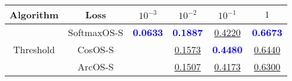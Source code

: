 \begin{table}[t]
\centering
\begin{tabularx}{.7\textwidth}{c|c|cccc}
\bf Algorithm & \bf Loss & $10^{-3}$ & $10^{-2}$ & $10^{-1}$ & $1$\\\hline\hline
\multirow{3}{*}{Threshold} & SoftmaxOS-S & \textcolor{blue}{\bf 0.0633} & \textcolor{blue}{\bf 0.1887} & \underline{0.4220} & \textcolor{blue}{\bf 0.6673}\\
 & CosOS-S & & \underline{0.1573} & \textcolor{blue}{\bf 0.4480} & \underline{0.6440}\\
 & ArcOS-S & & \underline{0.1507} & \underline{0.4173} & \underline{0.6300}\\
\hline
\end{tabularx}
\end{table}